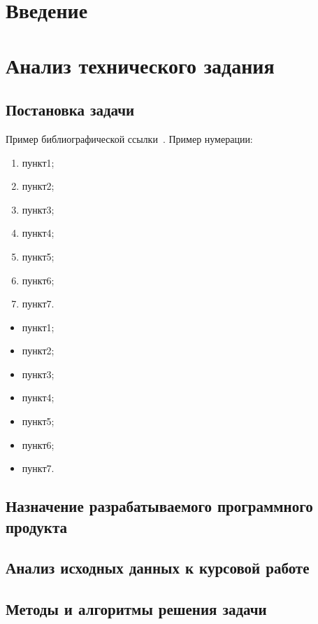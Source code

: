 \section*{Введение}
\lipsum[1-3]
\newpage



\section{Анализ технического задания}
\subsection{Постановка задачи}
\lipsum[4]

Пример библиографической ссылки~\cite{wiki_main}.
Пример нумерации:
\begin{enumerate}
\item пункт1;
\item пункт2;
\item пункт3;
\item пункт4;
\item пункт5;
\item пункт6;
\item пункт7.
\end{enumerate}

\lipsum[5]
\begin{itemize}
\item пункт1;
\item пункт2;
\item пункт3;
\item пункт4;
\item пункт5;
\item пункт6;
\item пункт7.
\end{itemize}

\subsection{Назначение разрабатываемого программного продукта}
\lipsum[6]

\subsection{Анализ исходных данных к курсовой работе}
\lipsum[7]

\subsection{Методы и алгоритмы решения задачи}
\lipsum[34]

